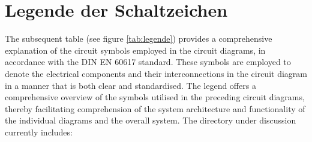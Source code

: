\section{Legende der Schaltzeichen}
The subsequent table (see figure \ref{tab:legende}) provides a comprehensive explanation of the circuit symbols employed in the circuit diagrams, in accordance with the DIN EN 60617 standard. These symbols are employed to denote the electrical components and their interconnections in the circuit diagram in a manner that is both clear and standardised. The legend offers a comprehensive overview of the symbols utilised in the preceding circuit diagrams, thereby facilitating comprehension of the system architecture and functionality of the individual diagrams and the overall system. The directory under discussion currently includes:

